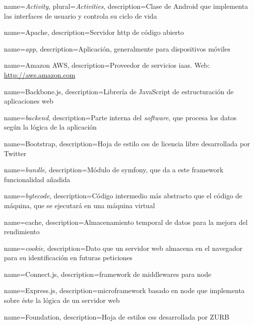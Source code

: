 
{
  name={\emph{Activity}},
  plural={\emph{Activities}},
  description={Clase de Android que implementa las interfaces de usuario y controla su ciclo de vida}
}

{
  name={Apache},
  description={Servidor \gls{http} de código abierto}
}

{
  name={\emph{app}},
  description={Aplicación, generalmente para dispositivos móviles}
}

{
  name={Amazon AWS},
  description={Proveedor de servicios \gls{iaas}. Web: \url{http://aws.amazon.com}}
}

{
  name={Backbone.js},
  description={Librería de JavaScript de estructuración de aplicaciones web}
}

{
  name={\emph{backend}},
  description={Parte interna del \emph{software}, que procesa los datos según la lógica de la aplicación}
}

{
  name={Bootstrap},
  description={Hoja de estilo \gls{css} de licencia libre desarrollada por Twitter}
}

{
  name={\emph{bundle}},
  description={Módulo de \gls{symfony}, que da a este \gls{framework} funcionalidad añadida}
}

{
  name={\emph{bytecode}},
  description={Código intermedio más abstracto que el código de máquina, que se ejecutará en una máquina virtual}
}

{
  name={cache},
  description={Almacenamiento temporal de datos para la mejora del rendimiento}
}

{
  name={\emph{cookie}},
  description={Dato que un servidor web almacena en el navegador para su identificación en futuras peticiones}
}

{
  name={Connect.js},
  description={\gls{framework} de \glspl{middleware} para \gls{node}}
}

{
  name={Express.js},
  description={\gls{microframework} basado en \gls{node} que implementa sobre éste la lógica de un servidor web}
}

{
  name={Foundation},
  description={Hoja de estilos \gls{css} desarrollada por ZURB}
}

